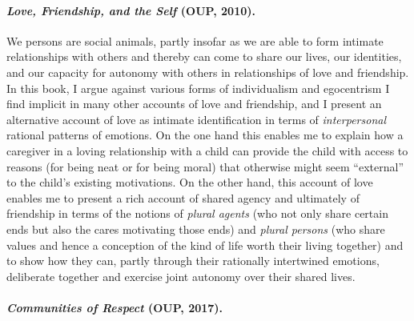 \documentclass[%
  11pt,%
]{article}
\let\oldparagraph\paragraph
\renewcommand\paragraph[1]{\oldparagraph{\textcolor{myblue}{#1}}}
\begin{document}
\paragraph{\emph{Love, Friendship, and the Self} (OUP, 2010).}

We persons are social animals, partly insofar as we are able to form intimate relationships with others and thereby can come to share our lives, our identities, and our capacity for autonomy with others in relationships of love and friendship. In this book, I argue against various forms of individualism and egocentrism I find implicit in many other accounts of love and friendship, and I present an alternative account of love as intimate identification in terms of \emph{interpersonal} rational patterns of emotions. On the one hand this enables me to explain how a caregiver in a loving relationship with a child can provide the child with access to reasons (for being neat or for being moral) that otherwise might seem \enquote{external} to the child's existing motivations. On the other hand, this account of love enables me to present a rich account of shared agency and ultimately of friendship in terms of the notions of \emph{plural agents} (who not only share certain ends but also the cares motivating those ends) and \emph{plural persons} (who share values and hence a conception of the kind of life worth their living together) and to show how they can, partly through their rationally intertwined emotions, deliberate together and exercise joint autonomy over their shared lives.

\paragraph{\emph{Communities of Respect} (OUP, 2017).}
\end{document}
